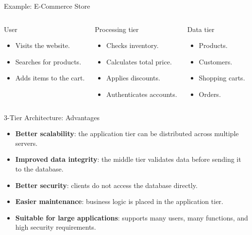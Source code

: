 \documentclass[aspectratio=169,11pt]{beamer}
\newcommand{\keyword}[1]{\textcolor{accent}{\textbf{#1}}}
\newcommand{\tightlist}{\setlength{\itemsep}{2pt}\setlength{\parskip}{0pt}}
\begin{document}
\begin{frame}{Example: E-Commerce Store}
\small
\begin{columns}[T]
\begin{block}{User}
\begin{itemize}
\tightlist
  \item Visits the website.
  \item Searches for products.
  \item Adds items to the cart.
\end{itemize}
\end{block}

\begin{block}{Processing tier}
\begin{itemize}
\tightlist
  \item Checks inventory.
  \item Calculates total price.
  \item Applies discounts.
  \item Authenticates accounts.
\end{itemize}
\end{block}

\begin{block}{Data tier}
\begin{itemize}
\tightlist
  \item Products.
  \item Customers.
  \item Shopping carts.
  \item Orders.
\end{itemize}
\end{block}
\end{columns}
\end{frame}

\begin{frame}{3-Tier Architecture: Advantages}
\small
\begin{itemize}
\tightlist
  \item \keyword{Better scalability}: the application tier can be distributed across multiple servers.
  \item \keyword{Improved data integrity}: the middle tier validates data before sending it to the database.
  \item \keyword{Better security}: clients do not access the database directly.
  \item \keyword{Easier maintenance}: business logic is placed in the application tier.
  \item \keyword{Suitable for large applications}: supports many users, many functions, and high security requirements.
\end{itemize}
\end{frame}
\end{document}
